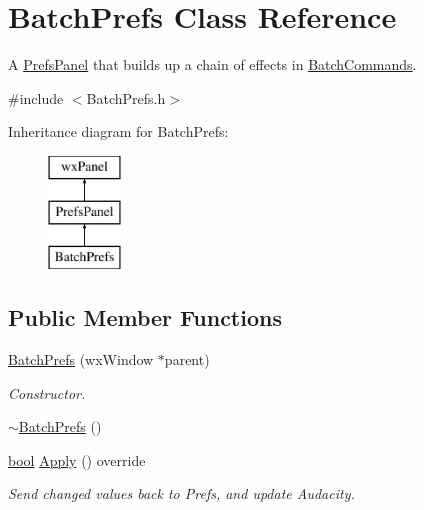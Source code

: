 \hypertarget{class_batch_prefs}{}\section{Batch\+Prefs Class Reference}
\label{class_batch_prefs}


A \hyperlink{class_prefs_panel}{Prefs\+Panel} that builds up a chain of effects in \hyperlink{class_batch_commands}{Batch\+Commands}.  




{\ttfamily \#include $<$Batch\+Prefs.\+h$>$}

Inheritance diagram for Batch\+Prefs\+:\begin{figure}[H]
\begin{center}
\leavevmode
\includegraphics[height=3.000000cm]{class_batch_prefs}
\end{center}
\end{figure}
\subsection*{Public Member Functions}
\begin{DoxyCompactItemize}
\item 
\hyperlink{class_batch_prefs_a63d1e07b4f213d08c7adb762dffd8e89}{Batch\+Prefs} (wx\+Window $\ast$parent)
\begin{DoxyCompactList}\small\item\em Constructor. \end{DoxyCompactList}\item 
\hyperlink{class_batch_prefs_a5612777a605f45a4b7c5b4a5945c632f}{$\sim$\+Batch\+Prefs} ()
\item 
\hyperlink{mac_2config_2i386_2lib-src_2libsoxr_2soxr-config_8h_abb452686968e48b67397da5f97445f5b}{bool} \hyperlink{class_batch_prefs_a2c32ab7fe80af07816b10eba1b6036f2}{Apply} () override
\begin{DoxyCompactList}\small\item\em Send changed values back to Prefs, and update Audacity. \end{DoxyCompactList}\end{DoxyCompactItemize}


